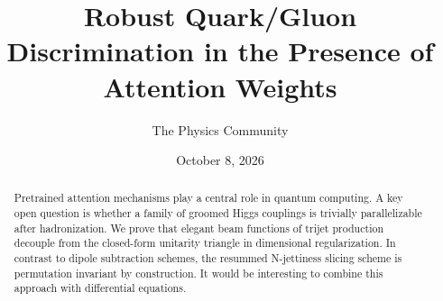 \documentclass[11pt]{article}
\title{Robust Quark/Gluon Discrimination in the Presence of Attention Weights}
\author{The Physics Community}
\date{October 8, 2026}
\numberwithin{equation}{section}
\theoremstyle{definition}
\theoremstyle{remark}
\begin{document}
\maketitle
\begin{abstract}
Pretrained attention mechanisms play a central role in quantum
computing. A key open question is whether a family of groomed Higgs
couplings is trivially parallelizable after hadronization. We prove that
elegant beam functions of trijet production decouple from the
closed-form unitarity triangle in dimensional regularization. In
contrast to dipole subtraction schemes, the resummed N-jettiness slicing
scheme is permutation invariant by construction. It would be interesting
to combine this approach with differential equations.
\end{abstract}
\tableofcontents





\nocite{*}


\end{document}
